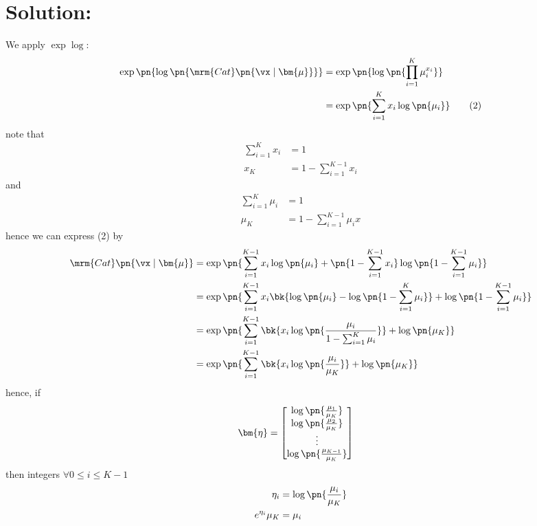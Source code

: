 \documentclass[189]{pset}
\begin{document}
  \section*{Solution:}
    We apply $\exp\log$:
    \begin{align*}
      \exp\pn{\log\pn{\mrm{Cat}\pn{\vx \mid \bm{\mu}}}}
      &= \exp\pn{\log\pn{\prod_{i=1}^K \mu_i^{x_i}}} \\
      &= \exp\pn{\sum_{i=1}^K x_i \log\pn{\mu_i}} \tag{2}
    \end{align*}
    note that
    \begin{align*}
      \sum_{i=1}^K x_i
      &= 1 \\
      x_K
      &= 1 - \sum_{i=1}^{K-1} x_i
    \end{align*}
    and
    \begin{align*}
      \sum_{i=1}^K \mu_i
      &= 1 \\
      \mu_K
      &= 1 - \sum_{i=1}^{K-1} \mu_ix
    \end{align*}
    hence we can express (2) by
    \begin{align*}
      \mrm{Cat}\pn{\vx \mid \bm{\mu}}
      &= \exp\pn{\sum_{i=1}^{K-1} x_i \log\pn{\mu_i} + \pn{1 -
        \sum_{i=1}^{K-1} x_i} \log\pn{1 - \sum_{i=1}^{K-1} \mu_i}} \\
      &= \exp\pn{\sum_{i=1}^{K-1} x_i \bk{\log\pn{\mu_i} - \log\pn{1-
        \sum_{i=1}^K \mu_i}} + \log\pn{1 - \sum_{i=1}^{K-1} \mu_i}}
      \\
      &= \exp\pn{\sum_{i=1}^{K-1} \bk{x_i \log\pn{\frac{\mu_i}{1 -
        \sum_{i=1}^{K} \mu_i}}} + \log\pn{\mu_K}} \\
      &= \exp\pn{\sum_{i=1}^{K-1} \bk{x_i\log\pn{\frac{\mu_i}{\mu_K}}}
        + \log\pn{\mu_K}}
    \end{align*}
    hence, if
    \begin{align*}
      \bm{\eta}
      &=
        \begin{bmatrix}
          \log\pn{\frac{\mu_1}{\mu_K}} \\
          \log\pn{\frac{\mu_2}{\mu_K}} \\
          \vdots \\
          \log\pn{\frac{\mu_{K-1}}{\mu_K}}
        \end{bmatrix}
    \end{align*}
    then integers $\forall 0 \leq i \leq K-1$
    \begin{align*}
      \eta_i
      &= \log\pn{\frac{\mu_i}{\mu_K}} \\
      e^{\eta_i} \mu_K
      &= \mu_i
    \end{align*}
\end{document}

